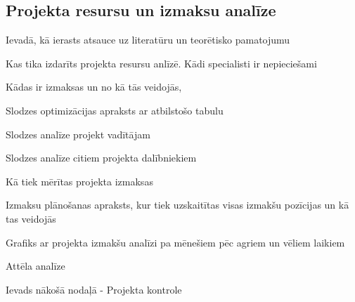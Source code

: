 \subsection{Projekta resursu un izmaksu analīze}
Ievadā, kā ierasts atsauce uz literatūru un teorētisko pamatojumu
\par
Kas tika izdarīts projekta resursu anlīzē. Kādi specialisti ir nepieciešami
\par
Kādas ir izmaksas un no kā tās veidojās, 
\par
Slodzes optimizācijas apraksts ar atbilstošo tabulu
\par
Slodzes analīze projekt vadītājam
\par
Slodzes analīze citiem projekta dalībniekiem
\par
Kā tiek mērītas projekta izmaksas
\par
Izmaksu plānošanas apraksts, kur tiek uzskaitītas visas izmakšu pozīcijas
un kā tas veidojās
\par
Grafiks ar projekta izmakšu analīzi pa mēnešiem pēc agriem un vēliem laikiem
\par
Attēla analīze
\par
Ievads nākošā nodaļā - Projekta kontrole